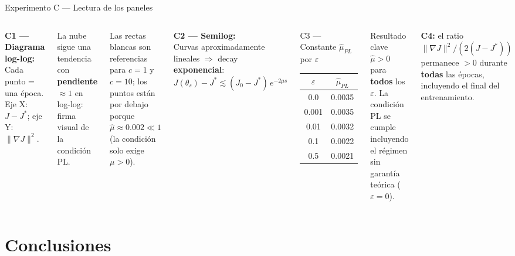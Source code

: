 \documentclass[10pt]{beamer}
\begin{document}
\begin{frame}{Experimento C — Lectura de los paneles}

\begin{columns}
\textbf{C1 — Diagrama log-log:}\\
Cada punto = una época. Eje X: $J-J^*$; eje Y: $\|\nabla J\|^2$.

La nube sigue una tendencia con \textbf{pendiente $\approx 1$} en log-log: firma visual de la condición PL.

Las rectas blancas son referencias para $c=1$ y $c=10$; los puntos están por debajo porque $\hat\mu\approx 0.002\ll 1$ (la condición solo exige $\mu>0$).

\bigskip
\textbf{C2 — Semilog:}\\
Curvas aproximadamente lineales $\Rightarrow$ decay \textbf{exponencial}:
\[
  J(\theta_s)-J^* \lesssim (J_0-J^*)\,e^{-2\mu s}
\]

\begin{block}{C3 — Constante $\hat\mu_{PL}$ por $\varepsilon$}
  \begin{tabular}{cc}
    \toprule
    $\varepsilon$ & $\hat\mu_{PL}$ \\
    \midrule
    0.0   & 0.0035 \\
    0.001 & 0.0035 \\
    0.01  & 0.0032 \\
    0.1   & 0.0022 \\
    0.5   & 0.0021 \\
    \bottomrule
  \end{tabular}
\end{block}

\begin{alertblock}{Resultado clave}
  $\hat\mu > 0$ para \textbf{todos} los $\varepsilon$. La condición PL se cumple incluyendo el régimen sin garantía teórica ($\varepsilon=0$).
\end{alertblock}

\medskip
\textbf{C4:} el ratio $\|\nabla J\|^2/(2(J-J^*))$ permanece $>0$ durante \textbf{todas} las épocas, incluyendo el final del entrenamiento.
\end{columns}

\end{frame}

\section{Conclusiones}
\end{document}
